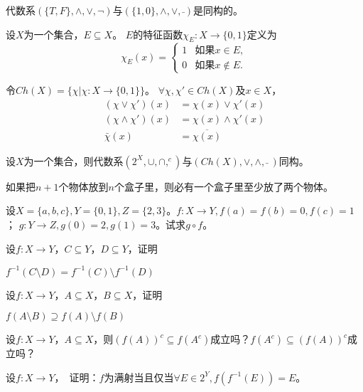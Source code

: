 代数系$(\{T,F\},\land,\lor,\lnot)$与$(\{1,0\},\land, \lor,\bar{ })$是同构的。
  \begin{Def}
    设$X$为一个集合，$E \subseteq X$。 $E$的特征函数$\chi_E:X\to \{0,1\}$定义为
    \begin{equation*}
      \chi_E(x)=
      \begin{cases}
        1 & \text{如果} x \in E,\\
        0 & \text{如果} x \notin E.
      \end{cases}
    \end{equation*}
  \end{Def}
  \begin{Def}
    令$Ch(X) = \{\chi |\chi:X \to \{0,1\}\}$。
    $\forall \chi, \chi' \in Ch(X)$及$x \in X$，
    \begin{align}
      (\chi \lor \chi')(x) &= \chi(x) \lor \chi'(x)\nonumber\\
      (\chi \land \chi')(x) &= \chi(x) \land \chi'(x)\nonumber\\
      \bar{\chi}(x) &=   \overline{\chi(x)}
    \end{align}
  \end{Def}
  \begin{Thm}
    设$X$为一个集合，则代数系$(2^X, \cup, \cap, ^c)$与$(Ch(X), \lor, \land, \bar{} \ )$同构。
  \end{Thm}

  \begin{Thm}[鸽笼原理]
    如果把$n+1$个物体放到$n$个盒子里，则必有一个盒子里至少放了两个物体。
  \end{Thm}
  

    \begin{Exercise}
  设$X=\{a,b,c\}, Y=\{0,1\}, Z=\{2,3\}$。$f:X \to Y, f(a) = f(b) = 0, f(c) = 1$；
  $g:Y\to Z, g(0) = 2, g(1) = 3$。试求$g\circ f$。
  \end{Exercise}
  \begin{Exercise}
    设$f:X \to Y$，$C \subseteq Y$，$D \subseteq Y$，证明

    $f^{-1}(C \setminus D) = f^{-1}(C) \setminus f^{-1}(D)$
  \end{Exercise}
    \begin{Exercise}
    设$f:X \to Y$，$A \subseteq X$，$B \subseteq X$，证明

    $f(A \setminus B) \supseteq f(A) \setminus f(B)$
    
  \end{Exercise}
  \begin{Exercise}
    设$f:X\to Y$，$A \subseteq X$，则$(f(A))^c \subseteq f(A^c)$成立吗？$ f(A^c)\subseteq (f(A))^c$成立吗？
  \end{Exercise}
  \begin{Exercise}
    设$f:X\to Y$，　证明：$f$为满射当且仅当$\forall E \in 2^Y, f(f^{-1}(E)) = E$。
  \end{Exercise}

